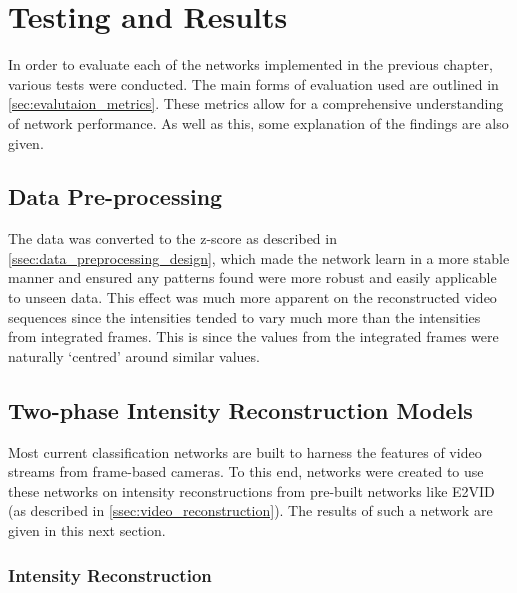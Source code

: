 \chapter{Testing and Results} \label{chap:testing_and_results}

In order to evaluate each of the networks implemented in the previous chapter, various tests were conducted. The main forms of evaluation used are outlined in \cref{sec:evalutaion_metrics}. These metrics allow for a comprehensive understanding of network performance. As well as this, some explanation of the findings are also given.

\section{Data Pre-processing}

The data was converted to the z-score as described in \cref{ssec:data_preprocessing_design}, which made the network learn in a more stable manner and ensured any patterns found were more robust and easily applicable to unseen data. This effect was much more apparent on the reconstructed video sequences since the intensities tended to vary much more than the intensities from integrated frames. This is since the values from the integrated frames were naturally `centred' around similar values.

\section{Two-phase Intensity Reconstruction Models}

Most current classification networks are built to harness the features of video streams from frame-based cameras. To this end, networks were created to use these networks on intensity reconstructions from pre-built networks like E2VID (as described in \cref{ssec:video_reconstruction}). The results of such a network are given in this next section.

\subsection{Intensity Reconstruction}

